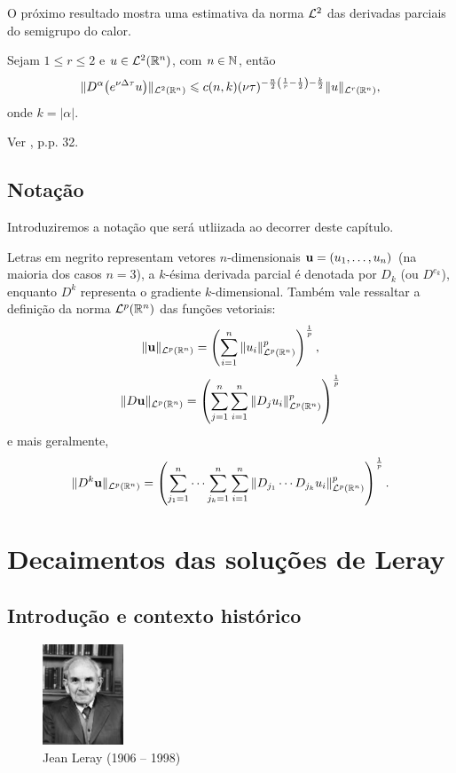 O próximo resultado mostra uma estimativa da norma $\mathcal{L}^2$ das derivadas parciais do semigrupo do calor.

\begin{pbox}
    Sejam $1 \leqslant r \leqslant 2$ e $u \in \mathcal{L}^2(\mathbb{R}^n)$, com $n \in \mathbb{N}$, então
    \begin{equation} \label{eq:estimativa-util}
        \Vert D^{\alpha} \big( e^{\nu\Delta\tau} u \big) \Vert_{\mathcal{L}^2(\mathbb{R}^n)} \leqslant c(n,k) (\nu\tau)^{-\frac{n}{2}\left( \frac{1}{r} - \frac{1}{2} \right) - \frac{k}{2}} \Vert u \Vert_{\mathcal{L}^r(\mathbb{R}^n)},
    \end{equation} 
    onde $k = |\alpha|$.
\end{pbox}
\begin{prf}
    Ver \cite{lorenz-navier.stokes}, p.p. 32.
\end{prf}

\subsection{Notação}

Introduziremos a notação que será utliizada ao decorrer deste capítulo.   

Letras em negrito representam vetores $n$-dimensionais $\mathbf{u} = (u_1,\dots,u_n)$ (na maioria dos casos $n = 3$),
a $k$-ésima derivada parcial é denotada por $D_k$ (ou $D^{e_k}$), enquanto $D^k$ representa o gradiente $k$-dimensional.
Também vale ressaltar a definição da norma $\mathcal{L}^p(\mathbb{R}^n)$ das funções vetoriais:
\[
    \Vert \mathbf{u} \Vert_{\mathcal{L}^p(\mathbb{R}^n)} = \left( \sum_{i=1}^n \Vert u_i \Vert_{\mathcal{L}^p(\mathbb{R}^n)}^p \right)^{\frac{1}{p}},
\]
\[
    \Vert D\mathbf{u} \Vert_{\mathcal{L}^p(\mathbb{R}^n)} = \left( \sum_{j=1}^n\sum_{i=1}^n \Vert D_ju_i \Vert_{\mathcal{L}^p(\mathbb{R}^n)}^p \right)^{\frac{1}{p}}
\]
e mais geralmente,
\[
    \Vert D^k\mathbf{u} \Vert_{\mathcal{L}^p(\mathbb{R}^n)} = \left( \sum_{j_1 = 1}^n \cdots \sum_{j_k  =1}^{n}\sum_{i=1}^n \Vert D_{j_1} \cdots D_{j_k}u_i \Vert_{\mathcal{L}^p(\mathbb{R}^n)}^p \right)^{\frac{1}{p}}.
\]

\section{Decaimentos das soluções de Leray}

\subsection{Introdução e contexto histórico} \label{sec:intro}

\begin{figure}
    \centering  
    \includegraphics[height=3cm]{leray.jpg}
    \caption{Jean Leray (1906 -- 1998)}
\end{figure}

